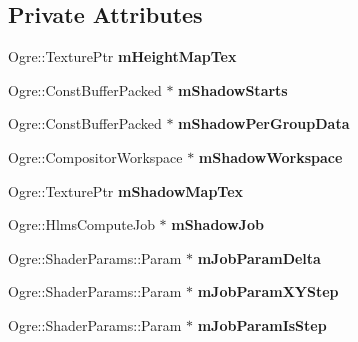 \subsection*{Private Attributes}
\begin{DoxyCompactItemize}
\item 
\mbox{\label{class_shadow_mapper_ae776a60c15e939d1f410e2c76f11c36b}} 
Ogre\+::\+Texture\+Ptr {\bfseries m\+Height\+Map\+Tex}
\item 
\mbox{\label{class_shadow_mapper_a25a59b36221761ff585466bd007b57b6}} 
Ogre\+::\+Const\+Buffer\+Packed $\ast$ {\bfseries m\+Shadow\+Starts}
\item 
\mbox{\label{class_shadow_mapper_aadb1c723556b6bd7f820367a61def60d}} 
Ogre\+::\+Const\+Buffer\+Packed $\ast$ {\bfseries m\+Shadow\+Per\+Group\+Data}
\item 
\mbox{\label{class_shadow_mapper_af384525eff0397e825335cac1383035a}} 
Ogre\+::\+Compositor\+Workspace $\ast$ {\bfseries m\+Shadow\+Workspace}
\item 
\mbox{\label{class_shadow_mapper_aa4ce21c6dc95445db1260e5c63a9b385}} 
Ogre\+::\+Texture\+Ptr {\bfseries m\+Shadow\+Map\+Tex}
\item 
\mbox{\label{class_shadow_mapper_a5c17b8b5ec20194c4fb4a7ff1de984f5}} 
Ogre\+::\+Hlms\+Compute\+Job $\ast$ {\bfseries m\+Shadow\+Job}
\item 
\mbox{\label{class_shadow_mapper_a05350d603d5cfad35eda8743abc1ecac}} 
Ogre\+::\+Shader\+Params\+::\+Param $\ast$ {\bfseries m\+Job\+Param\+Delta}
\item 
\mbox{\label{class_shadow_mapper_aadeaa1e03b1336e1a7766cb0bbd6ce6d}} 
Ogre\+::\+Shader\+Params\+::\+Param $\ast$ {\bfseries m\+Job\+Param\+X\+Y\+Step}
\item 
\mbox{\label{class_shadow_mapper_ae71ddf6f440e83eaefe0c896fc5b2829}} 
Ogre\+::\+Shader\+Params\+::\+Param $\ast$ {\bfseries m\+Job\+Param\+Is\+Step}
\item 
\mbox{\label{class_shadow_mapper_a51147036e095f3889d5529a61c83157e}} 

\end{DoxyCompactItemize}
